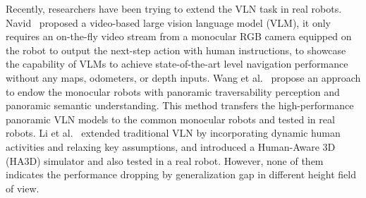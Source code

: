 Recently, researchers have been trying to extend the VLN task in real robots. Navid~\cite{zhang2024navid} proposed a video-based large vision language model (VLM), it only requires an on-the-fly video stream from a monocular RGB camera equipped on the robot to output the next-step action with human instructions, to showcase the capability of VLMs to achieve state-of-the-art level navigation performance without any maps, odometers, or depth inputs. Wang et al.~\cite{wang2024sim} propose an approach to endow the monocular robots with panoramic traversability perception and panoramic semantic understanding.  This method transfers the high-performance panoramic VLN models to the common monocular robots and tested in real robots. Li et al.~\cite{li2024human} extended traditional VLN by incorporating dynamic human activities and relaxing key assumptions, and introduced a Human-Aware 3D (HA3D) simulator and also tested in a real robot. However, none of them indicates the performance dropping by generalization gap in different height field of view.

